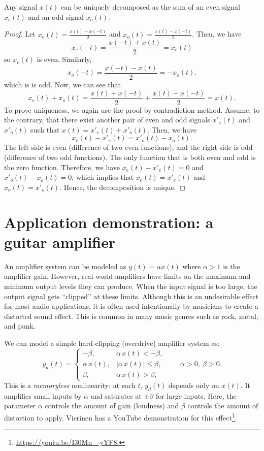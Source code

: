 \documentclass{ee102_notes}
\begin{document}
\begin{proposition}
    Any signal $x(t)$ can be uniquely decomposed as the sum of an even signal $x_e(t)$ and an odd signal $x_o(t)$.
\end{proposition}
\begin{proof}
    Let $x_e(t)=\frac{x(t)+x(-t)}{2}$ and $x_o(t)=\frac{x(t)-x(-t)}{2}$. Then, we have
    \[
    x_e(-t) = \frac{x(-t) + x(t)}{2} = x_e(t)
    \]
    so $x_e(t)$ is even. Similarly,
    \[
    x_o(-t) = \frac{x(-t) - x(t)}{2} = -x_o(t).
    \]
    which is is odd. Now, we can see that
    \[
    x_e(t) + x_o(t) = \frac{x(t) + x(-t)}{2} + \frac{x(t) - x(-t)}{2} = x(t).
    \]
    To prove uniqueness, we again use the proof by contradiction method. Assume, to the contrary, that there exist another pair of even and odd signals $x'_e(t)$ and $x'_o(t)$ such that $x(t) = x'_e(t) + x'_o(t)$. Then, we have
    \[
    x_e(t) - x'_e(t) = x'_o(t) - x_o(t).
    \]
    The left side is even (difference of two even functions), and the right side is odd (difference of two odd functions). The only function that is both even and odd is the zero function. Therefore, we have $x_e(t) - x'_e(t) = 0$ and $x'_o(t) - x_o(t) = 0$, which implies that $x_e(t) = x'_e(t)$ and $x_o(t) = x'_o(t)$. Hence, the decomposition is unique.
\end{proof}

\section{Application demonstration: a guitar amplifier}
An amplifier system can be modeled as $y(t) = \alpha x(t)$ where $\alpha > 1$ is the amplifier gain. However, real-world amplifiers have limits on the maximum and minimum output levels they can produce. When the input signal is too large, the output signal gets ``clipped'' at these limits. Although this is an undesirable effect for most audio applications, it is often used intentionally by musicians to create a distorted sound effect. This is common in many music genres such as rock, metal, and punk. 

We can model a simple hard-clipping (overdrive) amplifier system as:
\[
y_d(t)=
\begin{cases}
-\beta, & \alpha\,x(t)<-\beta,\\[2pt]
\alpha\,x(t), & |\alpha\,x(t)|\le \beta,\\[2pt]
\beta, & \alpha\,x(t)>\beta,
\end{cases}
\qquad \alpha>0,\ \beta>0.
\]
This is a \emph{memoryless} nonlinearity: at each $t$, $y_d(t)$ depends only on $x(t)$. It amplifies small inputs by $\alpha$ and saturates at $\pm\beta$ for large inputs.
Here, the parameter $\alpha$ controls the amount of gain (loudness) and $\beta$ controls the amount of distortion to apply. Vierinen has a YouTube demonstration for this effect\footnote{\url{https://youtu.be/I30Mn_-yYF8.}}.
\end{document}
